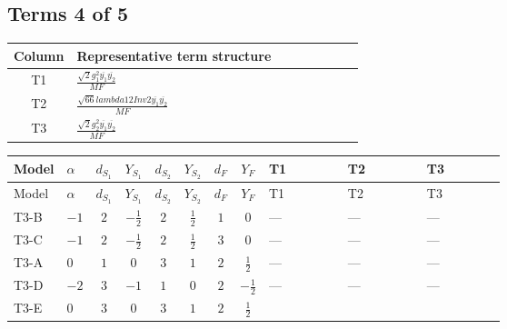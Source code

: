 \documentclass[8pt]{article}
\begin{document}
\begin{landscape}
\subsection*{Terms 4 of 5}
\begin{center}
\begin{tabular}{@{}c >{\raggedright\arraybackslash}p{0.82\linewidth}@{}}
\toprule
Column & Representative term structure \\
\midrule
T1 & \(\displaystyle \frac{\sqrt{2} g_{1}^{2} \overline{y_{1}} \overline{y_{2}}}{MF}\) \\
\midrule
T2 & \(\displaystyle \frac{\sqrt{66} lambda12Inv2 \overline{y_{1}} \overline{y_{2}}}{MF}\) \\
\midrule
T3 & \(\displaystyle \frac{\sqrt{2} g_{2}^{2} \overline{y_{1}} \overline{y_{2}}}{MF}\) \\
\midrule
\bottomrule
\end{tabular}
\end{center}
\smallskip
\tiny
\begin{longtable}{@{}llcccccc >{\raggedright\arraybackslash}p{0.21\linewidth} >{\raggedright\arraybackslash}p{0.21\linewidth} >{\raggedright\arraybackslash}p{0.21\linewidth}@{}}
\toprule
Model & $\alpha$ & $d_{S_1}$ & $Y_{S_1}$ & $d_{S_2}$ & $Y_{S_2}$ & $d_F$ & $Y_F$ & T1 & T2 & T3 \\
\midrule
\endfirsthead
\toprule
Model & $\alpha$ & $d_{S_1}$ & $Y_{S_1}$ & $d_{S_2}$ & $Y_{S_2}$ & $d_F$ & $Y_F$ & T1 & T2 & T3 \\
\midrule
\endhead
T3-B & $-1$ & $2$ & $-\frac{1}{2}$ & $2$ & $\frac{1}{2}$ & $1$ & $0$ & --- & --- & --- \\
\midrule
T3-C & $-1$ & $2$ & $-\frac{1}{2}$ & $2$ & $\frac{1}{2}$ & $3$ & $0$ & --- & --- & --- \\
\midrule
T3-A & $0$ & $1$ & $0$ & $3$ & $1$ & $2$ & $\frac{1}{2}$ & --- & --- & --- \\
\midrule
T3-D & $-2$ & $3$ & $-1$ & $1$ & $0$ & $2$ & $-\frac{1}{2}$ & --- & --- & --- \\
\midrule
T3-E & $0$ & $3$ & $0$ & $3$ & $1$ & $2$ & $\frac{1}{2}$ & \scriptsize\adjustbox{max width=\linewidth}{$\begin{gathered} \frac{3 \sqrt{2} g_{1}^{2} \overline{y_{1}} \overline{y_{2}}}{16 MF}\end{gathered}$} & \scriptsize\adjustbox{max width=\linewidth}{$\begin{gathered} \frac{3 \sqrt{66} lambda12Inv2 \overline{y_{1}} \overline{y_{2}}}{44 MF}\end{gathered}$} & \scriptsize\adjustbox{max width=\linewidth}{$\begin{gathered} \frac{45 \sqrt{2} g_{2}^{2} \overline{y_{1}} \overline{y_{2}}}{16 MF}\end{gathered}$} \\
\midrule
\bottomrule
\end{longtable}
\clearpage

\end{landscape}
\end{document}
